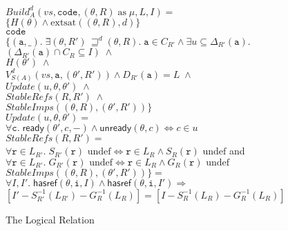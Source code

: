 \documentclass[preprint]{sigplanconf}
\newcommand{\betterstate}[3]{{#2}\, {\sqsupseteq}^{#1} {#3}}
\newcommand{\ready}[3]{\mathsf{ready}({#1}, {#2}, {#3})}
\newcommand{\unready}[2]{\mathsf{unready}({#1}, {#2})}
\newcommand{\hasref}[3]{\mathsf{hasref}({#1}, {#2}, {#3})}
\renewcommand{\implies}{\Rightarrow}
\newcommand{\term}[1]{\ensuremath{\mathtt{{#1}}}}
\newcommand{\Build}{\mathit{Build}}
\newcommand{\Update}{\mathit{Update}}
\newcommand{\StableRef}{\mathit{StableRefs}}
\newcommand{\StableImp}{\mathit{StableImps}}
\newcommand{\satisfyext}[2]{\mathrm{extsat}({#1}, {#2})}
\begin{document}
\begin{figure}
\begin{tabbing}
$\Build^d_A(vs, \term{code}, (\theta,R) \;\mathrm{as}\;\mu, L, I) = $ \\
\> $\{H(\theta) \land \satisfyext{(\theta,R)}{d} \}$ \\
\> $\term{code}$ \\
\> $\{(\term{a},\_).\;\exists$\=$\betterstate{d}{(\theta,R')}{(\theta,R)}.\; \term{a} \in C_{R'} \land \exists u \subseteq\Delta_{R'}(\term{a}).$ \\
\> \> $(\Delta_{R'}(\term{a}) \cap C_R \subseteq I) \;\land$ \\
\> \> $H(\theta') \;\land$ \\
\> \> $V^d_{S(A)}(vs, \term{a}, (\theta',R')) \land D_{R'}(\term{a}) = L \;\land$\\
\> \> $\Update(u, \theta, \theta') \;\land$ \\
\> \> $\StableRef(R, R') \;\land$ \\
\> \> $\StableImp((\theta, R), (\theta',R'))\}$ 
\\[1em]

$\Update(u, \theta, \theta') = $ \\
\> $\forall \term{c}.\;\ready{\theta'}{c}{-} \land \unready{\theta}{c} \iff c \in u$ 
\\[1em]

$\StableRef(R, R') = $ \\
\> $\forall \term{r} \in L_{R'}.\; S_{R'}(\term{r}) \mbox{ undef} \iff \term{r} \in L_R \land  S_{R}(\term{r}) \mbox{ undef}$ and \\
\> $\forall \term{r} \in L_{R'}.\; G_{R'}(\term{r}) \mbox{ undef} \iff \term{r} \in L_R \land  G_{R}(\term{r}) \mbox{ undef}$ 
\\[1em]

$\StableImp((\theta, R), (\theta',R'))\} = $ \\
\> $\forall I,I'.\;\hasref{\theta}{\term{i}}{I} \land \hasref{\theta}{\term{i}}{I'} \implies $ \\
\>\;\; $[I' - S^{-1}_{R'}(L_{R'}) - G^{-1}_{R}(L_{R})] = [I - S^{-1}_{R}(L_{R}) - G^{-1}_{R}(L_{R})]$ \\

\end{tabbing}
\caption{The Logical Relation}
\end{figure}
\end{document}

